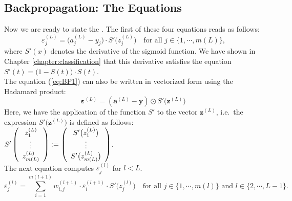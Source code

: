 \subsection{Backpropagation: The Equations}
Now we are ready to state the .  
The first of these four equations reads as follows:
\begin{equation}
  \label{eq:BP1}
  \varepsilon^{(L)}_j = \bigl(a_j^{(L)} - y_j\bigr) \cdot S'\bigl(z_j^{(L)}\bigr)
 \quad \mbox{for all $j \in \{1, \cdots, m(L)\}$,}
  \tag{BP1}
\end{equation}
where $S'(x)$ denotes the derivative of the sigmoid function.  We have shown in Chapter
\ref{chapter:classification} that this derivative satisfies the equation
\\[0.2cm]
\hspace*{1.3cm}
$S'(t) = \bigl(1 - S(t)\bigr) \cdot S(t)$.
\\[0.2cm]
The equation (\ref{eq:BP1}) can also be written in vectorized form using the Hadamard product:
\begin{equation}
  \label{eq:BP1s}
\boldsymbol{\varepsilon}^{(L)} = (\mathbf{a}^{(L)} - \mathbf{y}) \odot S'\bigl(\mathbf{z}^{(L)}\bigr)  
\tag{BP1v}
\end{equation}
Here, we have  the application of the function $S'$ to the vector $\mathbf{z}^{(L)}$, i.e.~the
expression $S'\bigl(\mathbf{z}^{(L)}\bigr)$ is defined as follows:
\\[0.2cm]
\hspace*{1.3cm}
$ S'\left(
  \begin{array}[c]{c}
   z_1^{(L)}      \\
   \vdots       \\
   z_{m(L)}^{(L)} 
  \end{array}
  \right) := \left(
  \begin{array}[c]{c}
   S'\bigl(z_1^{(L)}\bigr)      \\
   \vdots       \\
   S'\bigl(z_{m(L)}^{(L)}\bigr)
  \end{array}
  \right)
$.
\\[0.2cm]
The next equation computes $\varepsilon_j^{(l)}$ for $l < L$.  
\begin{equation}
  \label{eq:BP2}
  \varepsilon^{(l)}_j = \sum\limits_{i=1}^{m(l+1)} w_{i,j}^{(l+1)} \cdot \varepsilon^{(l+1)}_i \cdot
  S'\bigl(z^{(l)}_j\bigr) \quad \mbox{for all $j \in \{1, \cdots, m(l)\}$ and $l \in \{2, \cdots, L-1\}$}.
  \tag{BP2}
\end{equation}
